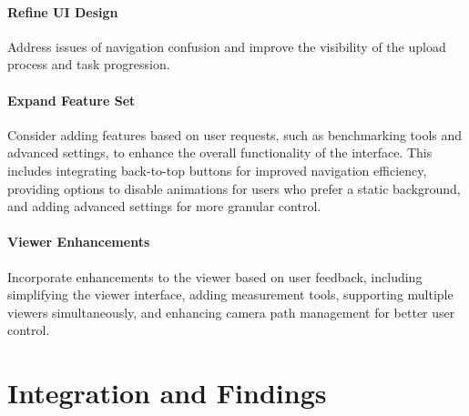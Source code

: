 \paragraph{Refine UI Design}
Address issues of navigation confusion and improve the visibility of the upload process and task progression.

\paragraph{Expand Feature Set}
Consider adding features based on user requests, such as benchmarking tools and advanced settings, to enhance the overall functionality of the interface. This includes integrating back-to-top buttons for improved navigation efficiency, providing options to disable animations for users who prefer a static background, and adding advanced settings for more granular control.

\paragraph{Viewer Enhancements}
Incorporate enhancements to the viewer based on user feedback, including simplifying the viewer interface, adding measurement tools, supporting multiple viewers simultaneously, and enhancing camera path management for better user control.

\section{Integration and Findings}
\label{sec:result:findings}

